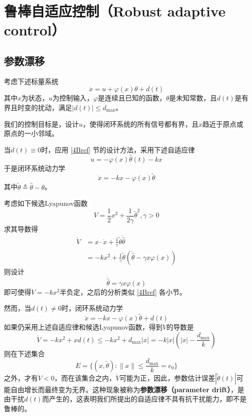 \section{鲁棒自适应控制（Robust adaptive control）}\label{4Eref}
\subsection{参数漂移}
考虑下述标量系统
\begin{equation}
    \dot{x} = u + \varphi(x)\theta + d(t)\label{Sys:with_disturbance}
\end{equation}
其中$x$为状态，$u$为控制输入，$\varphi$是连续且已知的函数，$\theta$是未知常数，且$d(t)$是有界且时变的扰动，满足$|d(t)|\le d_{\max}$。

我们的控制目标是，设计$u$，使得闭环系统的所有信号都有界，且$x$趋近于原点或原点的一小邻域。

当$d(t)\equiv 0$时，应用 \ref{4Bref} 节的设计方法，采用下述自适应律
\[ u=-\varphi(x)\hat{\theta}(t)-kx\]
于是闭环系统动力学
\[\dot{x}=-kx-\varphi(x)\tilde{\theta}\]
其中$\tilde{\theta} \triangleq \hat{\theta}-\theta$。

考虑如下候选Lyapunov函数
\[V=\frac12 x^2+\frac{1}{2\gamma}\tilde{\theta}^2,\gamma>0\]
求其导数得
\begin{align*}
    \dot{V}&=x\cdot\dot{x}+\frac{1}{\gamma}\tilde{\theta}\dot{\hat{\theta}}\\
    &=-kx^2+\frac{1}{\gamma}\tilde{\theta}(\dot{\hat{\theta}}-\gamma x\varphi(x))
\end{align*}
则设计
\begin{equation}
    \dot{\hat{\theta}}=\gamma x\varphi(x)\label{adaptive_nodisturbance}
\end{equation}
即可使得$\dot{V}=-kx^2$半负定，之后的分析类似 \ref{4Bref} 各小节。

然而，当$d(t)\ne 0$时，闭环系统动力学
\[\dot{x}=-kx-\varphi(x)\tilde{\theta}+d(t)\]
如果仍采用上述自适应律和候选Lyapunov函数，得到$V$的导数是
\[\dot{V}=-kx^2+x d(t)\le -kx^2+d_{\max}|x|=-k|x|(|x|-\frac{d_{\max}}{k})\]
则在下述集合
\[E = \{(x,\tilde{\theta}): \| x \| \leq \frac{d_{\max}}{k} = e_{0}\}\]
之外，才有$\dot{V}<0$，而在该集合之内，$\dot{V}$可能为正，因此，参数估计误差$|\tilde{\theta}(t)|$可能自由增长而最终变为无界。这种现象被称为{\bf 参数漂移（parameter drift）}，是由干扰$d(t)$而产生的，这表明我们所提出的自适应律不具有抗干扰能力，即不是鲁棒的。

